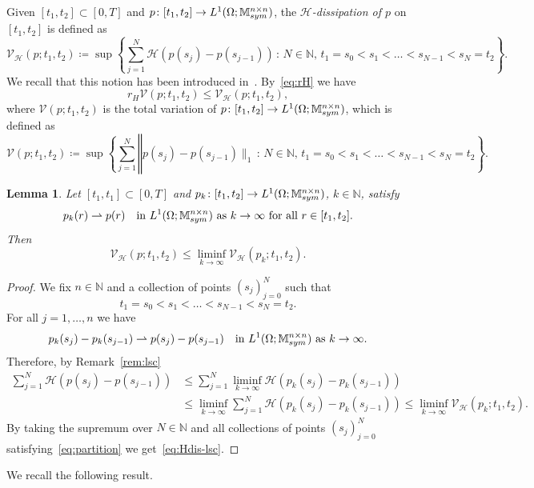 \documentclass[reqno]{amsart}
\newtheorem{lemma}[corollary]{Lemma}
\theoremstyle{definition}
\numberwithin{equation}{section}
\def\N {\mathbb N}
\def\M {\mathbb M^{n\times n}_{\rm sym}}
\begin{document}
Given $[t_1,t_2]\subset[0,T]$ and $p\colon [t_1,t_2]\to L^1(\Omega;\M)$, the {\it $\mathcal H$-dissipation of $p$} on $[t_1,t_2]$ is defined as
$$\mathcal V_{\mathcal H}(p;t_1,t_2)\coloneqq \sup\left\{\sum_{j=1}^N\mathcal H(p(s_j)-p(s_{j-1}))\,:\,N\in\N,\,t_1=s_0<s_1<\dots<s_{N-1}<s_N=t_2\right\}.$$
We recall that this notion has been introduced in~\cite[Appendix]{DMDSMo}. By~\eqref{eq:rH} we have
\begin{equation}\label{eq:rHvar}
r_H\mathcal V(p;t_1,t_2)\le \mathcal V_{\mathcal H}(p;t_1,t_2),
\end{equation}
where $\mathcal V(p;t_1,t_2)$ is the total variation of $p\colon [t_1,t_2]\to L^1(\Omega;\M)$, which is defined as
$$\mathcal V(p;t_1,t_2)\coloneqq \sup\left\{\sum_{j=1}^N\mathcal \|p(s_j)-p(s_{j-1})\|_1\,:\,N\in\N,\,t_1=s_0<s_1<\dots<s_{N-1}<s_N=t_2\right\}.$$

\begin{lemma}
Let $[t_1,t_1]\subset[0,T]$ and $p_k\colon [t_1,t_2]\to L^1(\Omega;\M)$, $k\in\N$, satisfy
$$p_k(r)\rightharpoonup p(r)\quad\text{in $L^1(\Omega;\M)$ as $k\to\infty$ for all $r\in[t_1,t_2]$}.$$
Then
\begin{equation}\label{eq:Hdis-lsc}
\mathcal V_{\mathcal H}(p;t_1,t_2)\le\liminf_{k\to\infty}\mathcal V_{\mathcal H}(p_k;t_1,t_2).    
\end{equation}
\end{lemma}

\begin{proof}
We fix $n\in\N$ and a collection of points $(s_j)_{j=0}^N$ such that
\begin{equation}\label{eq:partition}
t_1=s_0<s_1<\dots<s_{N-1}<s_N=t_2.   
\end{equation}
For all $j=1,\dots,n$ we have 
$$p_k(s_j)-p_k(s_{j-1})\rightharpoonup p(s_j)-p(s_{j-1})\quad\text{in $L^1(\Omega;\M)$ as $k\to\infty$}.$$
Therefore, by Remark~\ref{rem:lsc} \begin{align*}
\sum_{j=1}^N\mathcal H(p(s_j)-p(s_{j-1}))&\le \sum_{j=1}^N\liminf_{k\to\infty}\mathcal H(p_k(s_j)-p_k(s_{j-1}))\\
&\le \liminf_{k\to\infty}\sum_{j=1}^N\mathcal H(p_k(s_j)-p_k(s_{j-1}))\le \liminf_{k\to\infty}\mathcal V_{\mathcal H}(p_k;t_1,t_2).
\end{align*}
By taking the supremum over $N\in\N$ and all collections of points $(s_j)_{j=0}^N$ satisfying~\eqref{eq:partition} we get~\eqref{eq:Hdis-lsc}.
\end{proof}

We recall the following result.
\end{document}
